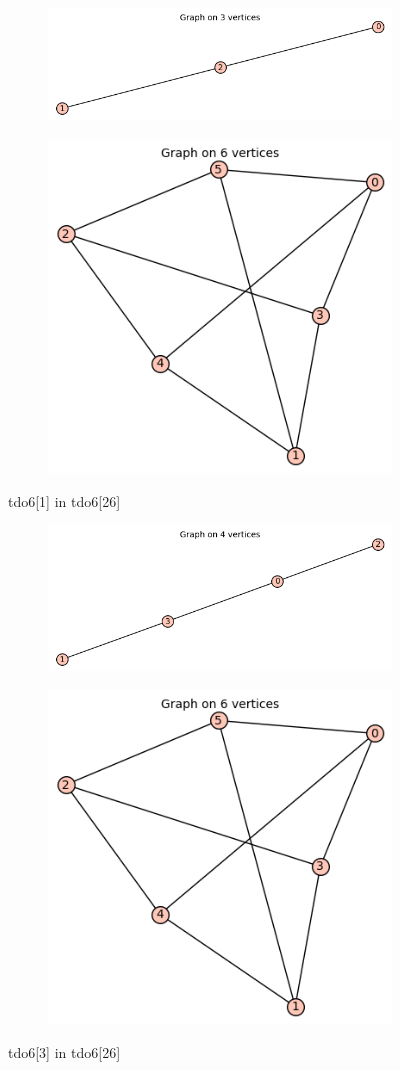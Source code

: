 \documentclass[12pt, a4paper]{article}
\begin{document}
\begin{center}
\begin{figure}[!htb]
\centering
\begin{subfigure}{0.5\textwidth}
  \centering
  \includegraphics[width=0.6\linewidth]{tdo6[1]}
\end{subfigure}%
\begin{subfigure}{0.5\textwidth}
  \centering
  \includegraphics[width=0.5\linewidth]{tdo6[26]}
\end{subfigure}
\caption{tdo6[1] in tdo6[26]}
\label{fig:test}
\end{figure}

\begin{figure}[!htb]
\centering
\begin{subfigure}{0.5\textwidth}
  \centering
  \includegraphics[width=0.55\linewidth]{tdo6[3]}
\end{subfigure}%
\begin{subfigure}{0.5\textwidth}
  \centering
  \includegraphics[width=0.5\linewidth]{tdo6[26]}
\end{subfigure}
\caption{tdo6[3] in tdo6[26]}
\label{fig:test}
\end{figure}


\end{center}
\end{document}
